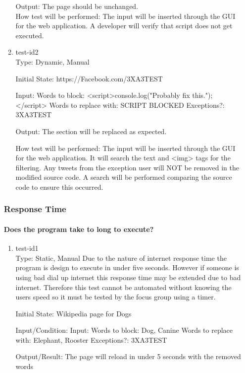 \documentclass[12pt, titlepage]{article}
\begin{document}
\begin{enumerate}
\begin{enumerate}
Output: The page should be unchanged.\\
				
How test will be performed: The input will be inserted through the GUI for the web application. A developer will verify that script does not get executed.
					
\item{test-id2\\}
Type: Dynamic, Manual
					
Initial State: https://Facebook.com/3XA3TEST
					
Input:  Words to block: <script>console.log("Probably fix this.");</script>
Words to replace with: SCRIPT BLOCKED
Exceptions?: 3XA3TEST
					
Output: The section will be replaced as expected. 

How test will be performed: The input will be inserted through the GUI for the web application. It will search the text and <img> tags for the filtering. Any tweets from the exception user will NOT be removed in the modified source code. A search will be performed comparing the source code to ensure this occurred.
\end{enumerate}
\subsubsection{Response Time}
		
\paragraph{Does the program take to long to execute?}
\begin{enumerate}
\item{test-id1\\}
Type: Static, Manual
 Due to the nature of internet response time the program is design to execute in under five seconds. However if someone is using bad dial up internet this response time may be extended due to bad internet. Therefore this test cannot be automated without knowing the users speed so it must be tested by the focus group using a timer.
					
Initial State: Wikipedia page for Dogs
					
Input/Condition: Input: Words to block: Dog, Canine
Words to replace with: Elephant, Rooster
Exceptions?: 3XA3TEST
					
Output/Result: The page will reload in under 5 seconds with the removed words
					

\end{enumerate}
\end{enumerate}
\end{document}
